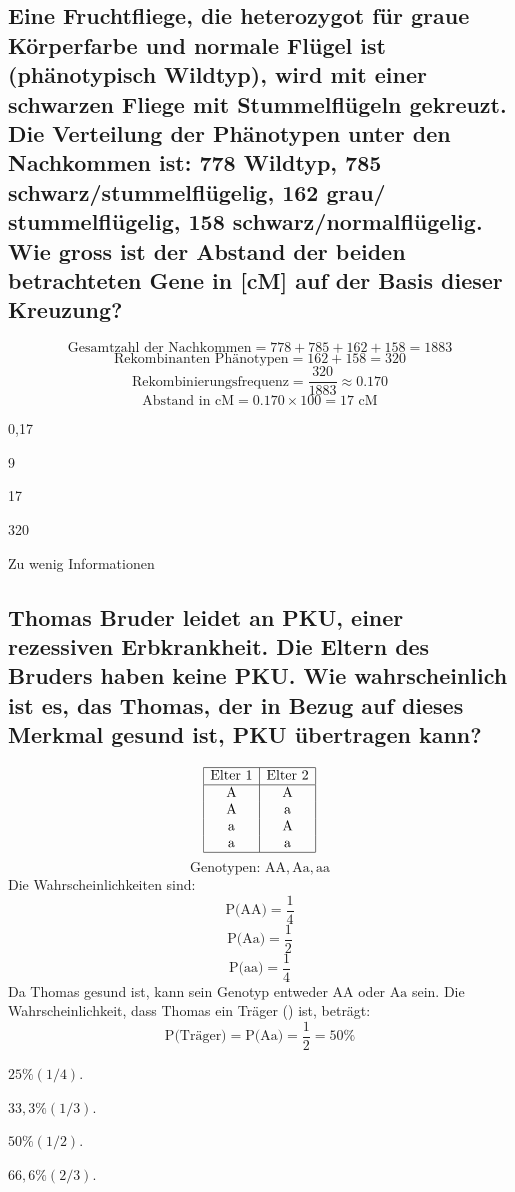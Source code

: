 \documentclass{article}
\newcommand{\cmark}{\ding{51}}%
\newcommand{\done}{\rlap{$\square$}{\raisebox{2pt}{\large\hspace{1pt}\cmark}}%
\hspace{-2.5pt}}
\begin{document}
\subsection*{Eine Fruchtfliege, die heterozygot für graue Körperfarbe und normale
Flügel ist (phänotypisch Wildtyp), wird mit einer schwarzen Fliege mit
Stummelflügeln gekreuzt. Die Verteilung der Phänotypen unter den
Nachkommen ist: 778 Wildtyp, 785 schwarz/stummelflügelig, 162 grau/
stummelflügelig, 158 schwarz/normalflügelig. Wie gross ist der Abstand
der beiden betrachteten Gene in [cM] auf der Basis dieser Kreuzung?}
\[
   \text{Gesamtzahl der Nachkommen} = 778 + 785 + 162 + 158 = 1883
   \]
   \[
   \text{Rekombinanten Phänotypen} = 162 + 158 = 320
   \]
   \[
   \text{Rekombinierungsfrequenz} = \frac{320}{1883} \approx 0.170
   \]
   \[
   \text{Abstand in cM} = 0.170 \times 100 = 17 \text{ cM}
   \]
\begin{todolist} %
\item 0,17
\item 9
\item[\done] 17
\item 320
\item Zu wenig Informationen 
\end{todolist}
\subsection*{Thomas Bruder leidet an PKU, einer rezessiven Erbkrankheit. Die Eltern
des Bruders haben keine PKU. Wie wahrscheinlich ist es, das Thomas,
der in Bezug auf dieses Merkmal gesund ist, PKU übertragen kann?}
\[
\begin{array}{|c|c|}
\hline
\text{Elter 1} & \text{Elter 2} \\
\hline
\text{A} & \text{A} \\
\text{A} & \text{a} \\
\text{a} & \text{A} \\
\text{a} & \text{a} \\
\hline
\end{array}
\]
\[
\text{Genotypen: } \text{AA}, \text{Aa}, \text{aa}
\]
Die Wahrscheinlichkeiten sind:
\[
\text{P(AA)} = \frac{1}{4}
\]
\[
\text{P(Aa)} = \frac{1}{2}
\]
\[
\text{P(aa)} = \frac{1}{4}
\]
Da Thomas gesund ist, kann sein Genotyp entweder \( \text{AA} \) oder \( \text{Aa} \) sein. Die Wahrscheinlichkeit, dass Thomas ein Träger () ist, beträgt:
\[
\text{P(Träger)} = \text{P(Aa)} = \frac{1}{2} = 50\%
\]
\begin{todolist} %
\item $25 \% (1/4).$
\item $33,3 \% (1/3).$
\item [\done] $50 \% (1/2).$
\item $66,6 \% (2/3).$
\end{todolist}
\end{document}
